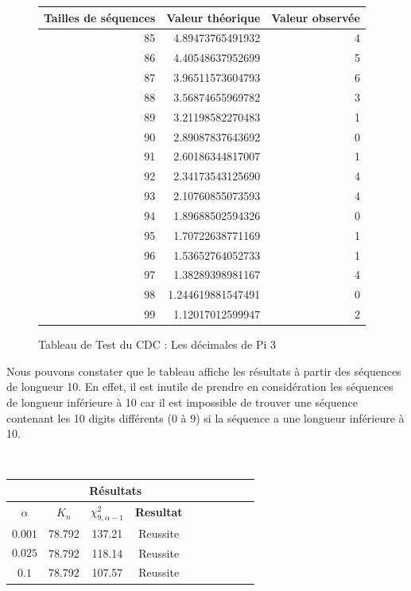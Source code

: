 \documentclass[french]{article}
\begin{document}
\begin{figure}[h]
	\centering
	\begin{tabular}{|r|r|r|}
		\hline
		Tailles de séquences & Valeur théorique & Valeur observée\\
		\hline
		85 & 4.89473765491932 & 4\\
		86 & 4.40548637952699 & 5\\
		87 & 3.96511573604793 & 6\\
		88 & 3.56874655969782 & 3\\
		89 & 3.21198582270483 & 1\\
		90 & 2.89087837643692 & 0\\
		91 & 2.60186344817007 & 1\\
		92 & 2.34173543125690 & 4\\
		93 & 2.10760855073593 & 4\\
		94 & 1.89688502594326 & 0\\
		95 & 1.70722638771169 & 1\\
		96 & 1.53652764052733 & 1\\
		97 & 1.38289398981167 & 4\\
		98 & 1.244619881547491 & 0\\
		99 & 1.12017012599947 & 2\\
		\hline
	\end{tabular}
	\caption{Tableau de Test du CDC : Les décimales de Pi 3}
\end{figure}

\newpage
Nous pouvons constater que le tableau affiche les résultats à partir des séquences de longueur 10. En effet, il est inutile de prendre en considération les séquences de longueur inférieure à 10 car il est impossible de trouver une séquence contenant les 10 digits différents (0 à 9) si la séquence a une longueur inférieure à 10.

\\
\begin{longtable}{|c|c|c|c|c|c|c|c|c|c|}
	\hline
	& \multicolumn{3}{c|}{\textbf{Résultats}} \\ 
	\hline 
	\textbf{$\alpha$}  & $K_{n}$ & $\chi^{2}_{9,\alpha-1}$ & \textbf{Resultat} \\ 
	\hline 
	$$0.001$$ & 78.792 & 137.21 & Reussite\\ 
	\hline 
	$$0.025$$ & 78.792 & 118.14 & Reussite\\ 
	\hline 
	$$0.1$$ & 78.792 & 107.57 & Reussite \\ 
	\hline 
\end{longtable}
\end{document}
